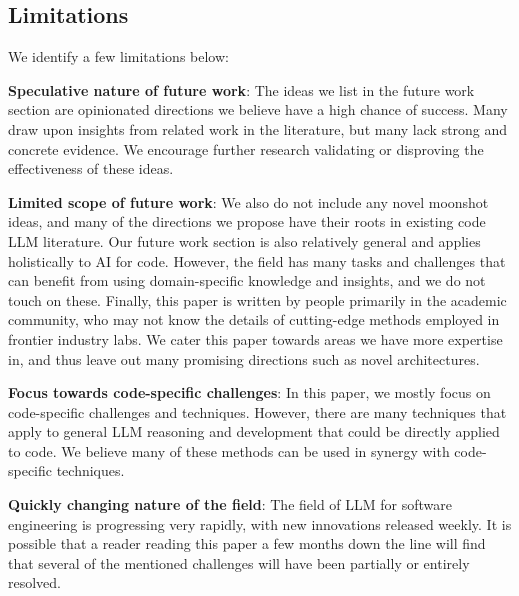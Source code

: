 \subsection{Limitations}
We identify a few limitations below:

\textbf{Speculative nature of future work}: The ideas we list in the future work section are opinionated directions we believe have a high chance of success. Many draw upon insights from related work in the literature, but many lack strong and concrete evidence. We encourage further research validating or disproving the effectiveness of these ideas.

\textbf{Limited scope of future work}:
We also do not include any novel moonshot ideas, and many of the directions we propose have their roots in existing code LLM literature. Our future work section is also relatively general and applies holistically to AI for code. However, the field has many tasks and challenges that can benefit from using domain-specific knowledge and insights, and we do not touch on these. Finally, this paper is written by people primarily in the academic community, who may not know the details of cutting-edge methods employed in frontier industry labs. We cater this paper towards areas we have more expertise in, and thus leave out many promising directions such as novel architectures. 

\textbf{Focus towards code-specific challenges}: In this paper, we mostly focus on code-specific challenges and techniques. However, there are many techniques that apply to general LLM reasoning and development that could be directly applied to code. We believe many of these methods can be used in synergy with code-specific techniques.

\textbf{Quickly changing nature of the field}: The field of LLM for software engineering is progressing very rapidly, with new innovations released weekly. It is possible that a reader reading this paper a few months down the line will find that several of the mentioned challenges will have been partially or entirely resolved.

